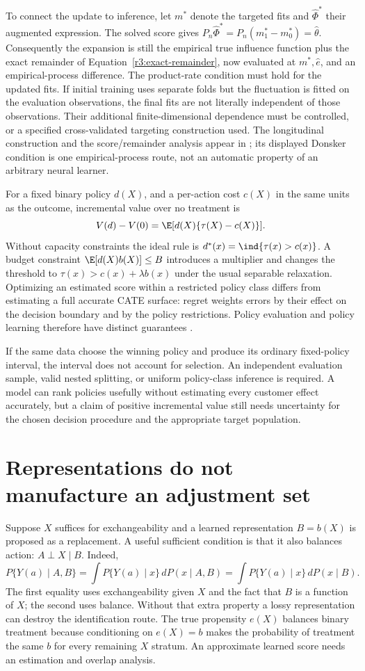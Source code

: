 To connect the update to inference, let $m^*$ denote the targeted fits
and $\widehat\Phi^*$ their augmented expression. The solved score gives
$P_n\widehat\Phi^*=P_n(m_1^*-m_0^*)=\widehat\theta$.
Consequently the expansion is still the empirical true influence
function plus the exact remainder of
Equation~\eqref{r3:exact-remainder}, now evaluated at $m^*,\widehat e$,
and an empirical-process difference. The product-rate condition must
hold for the updated fits. If initial training uses separate folds but
the fluctuation is fitted on the evaluation observations, the final fits
are not literally independent of those observations. Their additional
finite-dimensional dependence must be controlled, or a specified
cross-validated targeting construction used. The longitudinal
construction and the score/remainder analysis appear in
\citet[Chapter 4, Sections 4.4--4.5]{targeted2018}; its displayed
Donsker condition is one empirical-process route, not an automatic
property of an arbitrary neural learner.

For a fixed binary policy $d(X)$, and a per-action cost $c(X)$ in the
same units as the outcome, incremental value over no treatment is
\[
 V(d)-V(0)=\E[d(X)\{\tau(X)-c(X)\}].
\]
Without capacity constraints the ideal rule is
$d^*(x)=\ind\{\tau(x)>c(x)\}$. A budget constraint
$\E[d(X)b(X)]\le B$ introduces a multiplier and changes the threshold
to $\tau(x)>c(x)+\lambda b(x)$ under the usual separable relaxation.
Optimizing an estimated score within a restricted policy class differs
from estimating a full accurate CATE surface: regret weights errors by
their effect on the decision boundary and by the policy restrictions.
Policy evaluation and policy learning therefore have distinct guarantees
\citep{policy2021}.

If the same data choose the winning policy and produce its ordinary
fixed-policy interval, the interval does not account for selection.
An independent evaluation sample, valid nested splitting, or uniform
policy-class inference is required. A model can rank policies usefully
without estimating every customer effect accurately, but a claim of
positive incremental value still needs uncertainty for the chosen
decision procedure and the appropriate target population.

\section{Representations do not manufacture an adjustment set}
\label{r3:representation}
Suppose $X$ suffices for exchangeability and a learned representation
$B=b(X)$ is proposed as a replacement. A useful sufficient condition is
that it also balances action: $A\perp X\mid B$. Indeed,
\[
 P\{Y(a)\mid A,B\}
 =\int P\{Y(a)\mid x\}\,dP(x\mid A,B)
 =\int P\{Y(a)\mid x\}\,dP(x\mid B).
\]
The first equality uses exchangeability given $X$ and the fact that
$B$ is a function of $X$; the second uses balance. Without that extra
property a lossy representation can destroy the identification route.
The true propensity $e(X)$ balances binary treatment because conditioning
on $e(X)=b$ makes the probability of treatment the same $b$ for every
remaining $X$ stratum. An approximate learned score needs an estimation
and overlap analysis.

